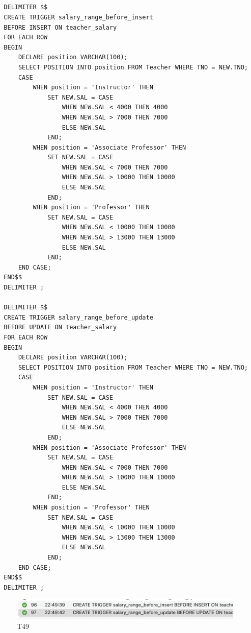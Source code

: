 \documentclass[UTF8]{ctexart}
\begin{document}
\subsection{}
\begin{lstlisting}
  DELIMITER $$
  CREATE TRIGGER salary_range_before_insert
  BEFORE INSERT ON teacher_salary
  FOR EACH ROW
  BEGIN
      DECLARE position VARCHAR(100);
      SELECT POSITION INTO position FROM Teacher WHERE TNO = NEW.TNO;
      CASE
          WHEN position = 'Instructor' THEN
              SET NEW.SAL = CASE
                  WHEN NEW.SAL < 4000 THEN 4000
                  WHEN NEW.SAL > 7000 THEN 7000
                  ELSE NEW.SAL
              END;
          WHEN position = 'Associate Professor' THEN
              SET NEW.SAL = CASE
                  WHEN NEW.SAL < 7000 THEN 7000
                  WHEN NEW.SAL > 10000 THEN 10000
                  ELSE NEW.SAL
              END;
          WHEN position = 'Professor' THEN
              SET NEW.SAL = CASE
                  WHEN NEW.SAL < 10000 THEN 10000
                  WHEN NEW.SAL > 13000 THEN 13000
                  ELSE NEW.SAL
              END;
      END CASE;
  END$$
  DELIMITER ;
  
  DELIMITER $$
  CREATE TRIGGER salary_range_before_update
  BEFORE UPDATE ON teacher_salary
  FOR EACH ROW
  BEGIN
      DECLARE position VARCHAR(100);
      SELECT POSITION INTO position FROM Teacher WHERE TNO = NEW.TNO;
      CASE
          WHEN position = 'Instructor' THEN
              SET NEW.SAL = CASE
                  WHEN NEW.SAL < 4000 THEN 4000
                  WHEN NEW.SAL > 7000 THEN 7000
                  ELSE NEW.SAL
              END;
          WHEN position = 'Associate Professor' THEN
              SET NEW.SAL = CASE
                  WHEN NEW.SAL < 7000 THEN 7000
                  WHEN NEW.SAL > 10000 THEN 10000
                  ELSE NEW.SAL
              END;
          WHEN position = 'Professor' THEN
              SET NEW.SAL = CASE
                  WHEN NEW.SAL < 10000 THEN 10000
                  WHEN NEW.SAL > 13000 THEN 13000
                  ELSE NEW.SAL
              END;
      END CASE;
  END$$
  DELIMITER ;
\end{lstlisting}
\begin{figure}[H]
  \centering
  \includegraphics[scale=0.7]{pics/49.png}
  \caption*{T49}
\end{figure}
\end{document}
